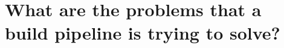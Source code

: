 \documentclass{article}
\newcommand{\question}[1]{\section{#1}}
\begin{document}
\question{What are the problems that a build pipeline is trying to solve?}


{\footnotesize
\begin{thebibliography}{5}
\end{thebibliography}
}

\clearpage
\question{}

\end{document}
